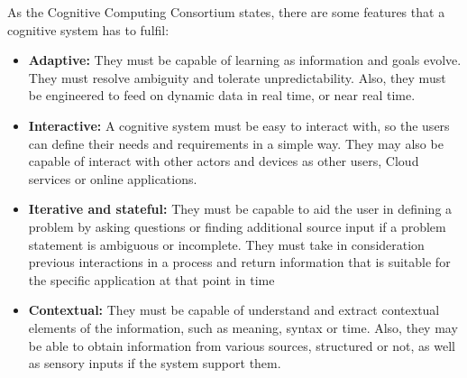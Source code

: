 As the Cognitive Computing Consortium states, there are some features that a cognitive system has to fulfil: 
\begin{itemize}
    \item \textbf{Adaptive:} They must be capable of learning as information and goals evolve. They must resolve ambiguity and tolerate unpredictability. Also, they must be engineered to feed on dynamic data in real time, or near real time.
    \item \textbf{Interactive:} A cognitive system must be easy to interact with, so the users can define their needs and requirements in a simple way. They may also be capable of interact with other actors and devices as other users, Cloud services or online applications.
    \item \textbf{Iterative and stateful:} They must be capable to aid the user in defining a problem by asking questions or finding additional source input if a problem statement is ambiguous or incomplete. They must take in consideration previous interactions in a process and return information that is suitable for the specific application at that point in time
    \item \textbf{Contextual:} They must be capable of understand and extract contextual elements of the information, such as meaning, syntax or time. Also, they may be able to obtain information from various sources, structured or not, as well as sensory inputs if the system support them.
\end{itemize}

